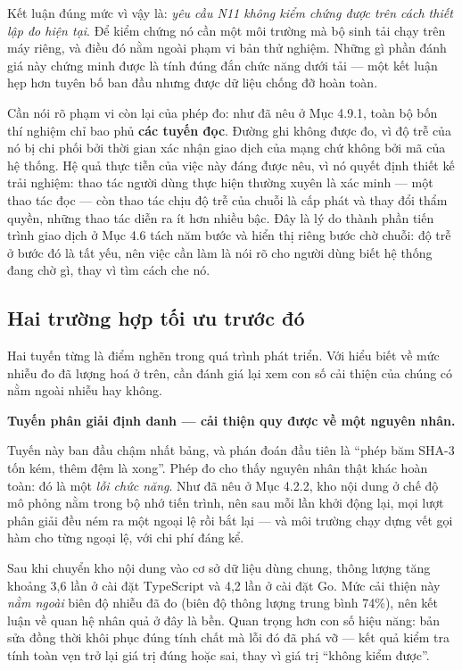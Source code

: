 Kết luận đúng mức vì vậy là: \emph{yêu cầu N11 không kiểm chứng được trên cách thiết lập đo hiện tại}. Để kiểm chứng nó cần một môi trường mà bộ sinh tải chạy trên máy riêng, và điều đó nằm ngoài phạm vi bản thử nghiệm. Những gì phần đánh giá này chứng minh được là tính đúng đắn chức năng dưới tải --- một kết luận hẹp hơn tuyên bố ban đầu nhưng được dữ liệu chống đỡ hoàn toàn.

Cần nói rõ phạm vi còn lại của phép đo: như đã nêu ở Mục 4.9.1, toàn bộ bốn thí nghiệm chỉ bao phủ \textbf{các tuyến đọc}. Đường ghi không được đo, vì độ trễ của nó bị chi phối bởi thời gian xác nhận giao dịch của mạng chứ không bởi mã của hệ thống. Hệ quả thực tiễn của việc này đáng được nêu, vì nó quyết định thiết kế trải nghiệm: thao tác người dùng thực hiện thường xuyên là xác minh --- một thao tác đọc --- còn thao tác chịu độ trễ của chuỗi là cấp phát và thay đổi thẩm quyền, những thao tác diễn ra ít hơn nhiều bậc. Đây là lý do thành phần tiến trình giao dịch ở Mục 4.6 tách năm bước và hiển thị riêng bước chờ chuỗi: độ trễ ở bước đó là tất yếu, nên việc cần làm là nói rõ cho người dùng biết hệ thống đang chờ gì, thay vì tìm cách che nó.

\subsection{Hai trường hợp tối ưu trước đó}

Hai tuyến từng là điểm nghẽn trong quá trình phát triển. Với hiểu biết về mức nhiễu đo đã lượng hoá ở trên, cần đánh giá lại xem con số cải thiện của chúng có nằm ngoài nhiễu hay không.

\noindent \textbf{Tuyến phân giải định danh --- cải thiện quy được về một nguyên nhân.}

Tuyến này ban đầu chậm nhất bảng, và phán đoán đầu tiên là {``}phép băm SHA-3 tốn kém, thêm đệm là xong{''}. Phép đo cho thấy nguyên nhân thật khác hoàn toàn: đó là một \emph{lỗi chức năng}. Như đã nêu ở Mục 4.2.2, kho nội dung ở chế độ mô phỏng nằm trong bộ nhớ tiến trình, nên sau mỗi lần khởi động lại, mọi lượt phân giải đều ném ra một ngoại lệ rồi bắt lại --- và môi trường chạy dựng vết gọi hàm cho từng ngoại lệ, với chi phí đáng kể.

Sau khi chuyển kho nội dung vào cơ sở dữ liệu dùng chung, thông lượng tăng khoảng 3,6 lần ở cài đặt TypeScript và 4,2 lần ở cài đặt Go. Mức cải thiện này \emph{nằm ngoài} biên độ nhiễu đã đo (biên độ thông lượng trung bình 74\%), nên kết luận về quan hệ nhân quả ở đây là bền. Quan trọng hơn con số hiệu năng: bản sửa đồng thời khôi phục đúng tính chất mà lỗi đó đã phá vỡ --- kết quả kiểm tra tính toàn vẹn trở lại giá trị đúng hoặc sai, thay vì giá trị {``}không kiểm được{''}.

